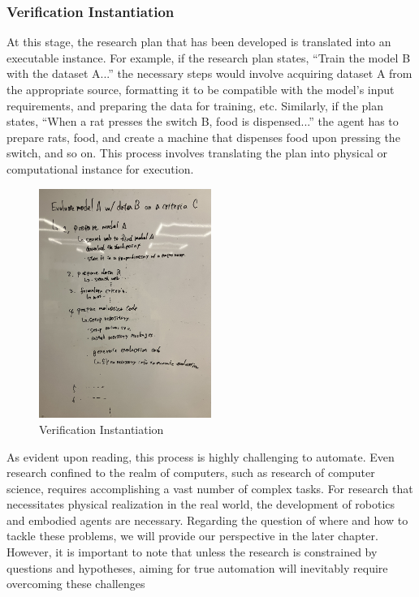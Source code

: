 \subsubsection{Verification Instantiation} 
At this stage, the research plan that has been developed is translated into an executable instance. For example, if the research plan states, ``Train the model B with the dataset A...'' the necessary steps would involve acquiring dataset A from the appropriate source, formatting it to be compatible with the model's input requirements, and preparing the data for training, etc. Similarly, if the plan states, ``When a rat presses the switch B, food is dispensed...'' the agent has to prepare rats, food, and create a machine that dispenses food upon pressing the switch, and so on. This process involves translating the plan into physical or computational instance for execution.

\begin{figure}[htb]
    \centering
    \includegraphics[width=0.5\textwidth]{figs/verification_instantiation.jpg}
    \caption{Verification Instantiation}
    \label{fig:verification_instantiation}
\end{figure}

As evident upon reading, this process is highly challenging to automate. Even research confined to the realm of computers, such as research of computer science, requires accomplishing a vast number of complex tasks. For research that necessitates physical realization in the real world, the development of robotics and embodied agents are necessary. Regarding the question of where and how to tackle these problems, we will provide our perspective in the later chapter. However, it is important to note that unless the research is constrained by questions and hypotheses, aiming for true automation will inevitably require overcoming these challenges

